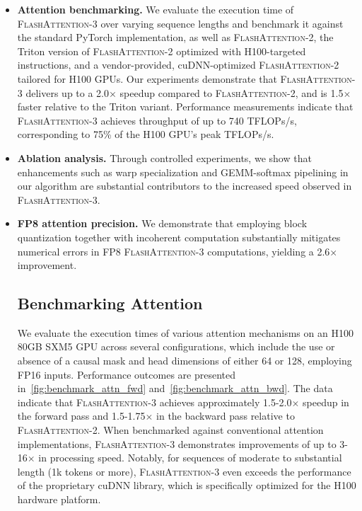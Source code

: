 \begin{algorithm}[H]
\begin{algorithmic}[1]
\begin{enumerate}
\begin{itemize}
\item \textbf{Attention benchmarking.} We evaluate the execution time of \textsc{FlashAttention-3} over varying sequence lengths and benchmark it against the standard PyTorch implementation, as well as \textsc{FlashAttention-2}, the Triton version of \textsc{FlashAttention-2} optimized with H100-targeted instructions, and a vendor-provided, cuDNN-optimized \textsc{FlashAttention-2} tailored for H100 GPUs. Our experiments demonstrate that \textsc{FlashAttention-3} delivers up to a 2.0$\times$ speedup compared to \textsc{FlashAttention-2}, and is 1.5$\times$ faster relative to the Triton variant. Performance measurements indicate that \textsc{FlashAttention-3} achieves throughput of up to 740 TFLOPs/s, corresponding to 75\% of the H100 GPU's peak TFLOPs/s.
\item \textbf{Ablation analysis.} Through controlled experiments, we show that enhancements such as warp specialization and GEMM-softmax pipelining in our algorithm are substantial contributors to the increased speed observed in \textsc{FlashAttention-3}.
\item \textbf{FP8 attention precision.} We demonstrate that employing block quantization together with incoherent computation substantially mitigates numerical errors in FP8 \textsc{FlashAttention-3} computations, yielding a 2.6$\times$ improvement.

\subsection{Benchmarking Attention}
\label{subsec:benchmark_attn}

We evaluate the execution times of various attention mechanisms on an H100 80GB SXM5 GPU across several configurations, which include the use or absence of a causal mask and head dimensions of either 64 or 128, employing FP16 inputs. Performance outcomes are presented in~\cref{fig:benchmark_attn_fwd} and~\cref{fig:benchmark_attn_bwd}. The data indicate that \textsc{FlashAttention-3} achieves approximately 1.5-2.0$\times$ speedup in the forward pass and 1.5-1.75$\times$ in the backward pass relative to \textsc{FlashAttention-2}. When benchmarked against conventional attention implementations, \textsc{FlashAttention-3} demonstrates improvements of up to 3-16$\times$ in processing speed. Notably, for sequences of moderate to substantial length (1k tokens or more), \textsc{FlashAttention-3} even exceeds the performance of the proprietary cuDNN library, which is specifically optimized for the H100 hardware platform.


\end{itemize}
\end{enumerate}
\end{algorithmic}
\end{algorithm}

